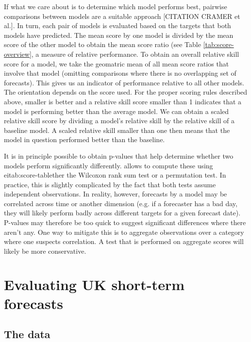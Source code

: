 \documentclass[article,shortnames]{jss}
\begin{document}
If what we care about is to determine which model performs best, pairwise comparisons between models are a suitable approach [CITATION CRAMER et al.]. In turn, each pair of models is evaluated based on the targets that both models have predicted. The mean score by one model is divided by the mean score of the other model to obtain the mean score ratio (see Table \ref{tab:score-overview}, a measure of relative performance. To obtain an overall relative skill score for a model, we take the geomatric mean of all mean score ratios that involve that model  (omitting comparisons where there is no overlapping set of forecasts). This gives us an indicator of performance relative to all other models. The orientation depends on the score used. For the proper scoring rules described above, smaller is better and a relative skill score smaller than 1 indicates that a model is performing better than the average model. We can obtain a scaled relative skill score by dividing a model's relative skill by the relative skill of a baseline model. A scaled relative skill smaller than one then means that the model in question performed better than the baseline. 

It is in principle possible to obtain p-values that help determine whether two models perform significantly differently.  allows to compute these using eitab:score-tablether the Wilcoxon rank sum test or a permutation test. In practice, this is slightly complicated by the fact that both tests assume independent observations. In reality, however, forecasts by a model may be correlated across time or another dimension (e.g. if a forecaster has a bad day, they will likely perform badly across different targets for a given forecast date). P-values may therefore be too quick to suggest significant differences where there aren't any. One way to mitigate this is to aggregate observations over a category where one suspects correlation. A test that is performed on aggregate scores will likely be more conservative. 



\section{Evaluating UK short-term forecasts}
\subsection{The data}
\end{document}
